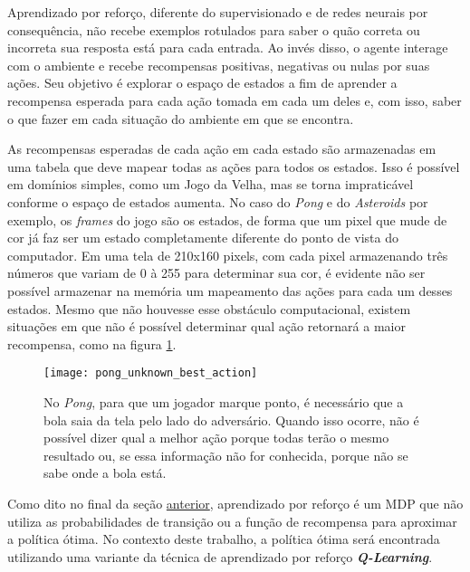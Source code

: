 Aprendizado por reforço, diferente do supervisionado e de redes neurais por consequência, não recebe exemplos rotulados para saber o quão correta ou incorreta sua resposta está para cada entrada.
Ao invés disso, o agente interage com o ambiente e recebe recompensas positivas, negativas ou nulas por suas ações.
Seu objetivo é explorar o espaço de estados a fim de aprender a recompensa esperada para cada ação tomada em cada um deles e, com isso, saber o que fazer em cada situação do ambiente em que se encontra.

As recompensas esperadas de cada ação em cada estado são armazenadas em uma tabela que deve mapear todas as ações para todos os estados.
Isso é possível em domínios simples, como um Jogo da Velha, mas se torna impraticável conforme o espaço de estados aumenta.
No caso do \textit{Pong} e do \textit{Asteroids} por exemplo, os \textit{frames} do jogo são os estados, de forma que um pixel que mude de cor já faz ser um estado completamente diferente do ponto de vista do computador.
Em uma tela de 210x160 pixels, com cada pixel armazenando três números que variam de 0 à 255 para determinar sua cor, é evidente não ser possível armazenar na memória um mapeamento das ações para cada um desses estados.
Mesmo que não houvesse esse obstáculo computacional, existem situações em que não é possível determinar qual ação retornará a maior recompensa, como na figura \ref{fig:unknown_best_action}.

\begin{figure}[h!]
  \centering
  \texttt{[image: pong\_unknown\_best\_action]}
  \caption{No \textit{Pong}, para que um jogador marque ponto, é necessário que a bola saia da tela pelo lado do adversário. Quando isso ocorre, não é possível dizer qual a melhor ação porque todas terão o mesmo resultado ou, se essa informação não for conhecida, porque não se sabe onde a bola está.}
  \label{fig:unknown_best_action}
\end{figure}

Como dito no final da seção \hyperref[sec:mdp]{anterior}, aprendizado por reforço é um MDP que não utiliza as probabilidades de transição ou a função de recompensa para aproximar a política ótima.
No contexto deste trabalho, a política ótima será encontrada utilizando uma variante da técnica de aprendizado por reforço \textit{\textbf{Q-Learning}}.

